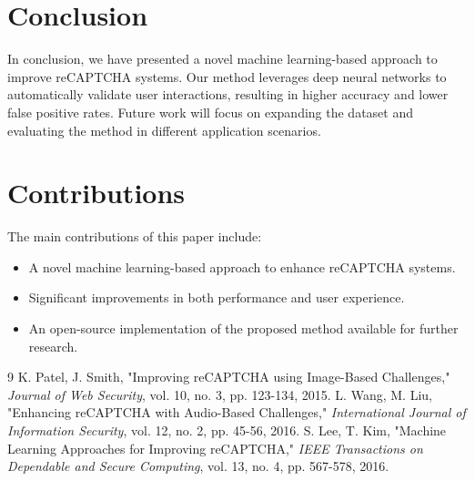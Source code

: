 \documentclass{article}
\begin{document}
\section{Conclusion}
In conclusion, we have presented a novel machine learning-based approach to improve reCAPTCHA systems. Our method leverages deep neural networks to automatically validate user interactions, resulting in higher accuracy and lower false positive rates. Future work will focus on expanding the dataset and evaluating the method in different application scenarios.

\section{Contributions}
The main contributions of this paper include:
\begin{itemize}
    \item A novel machine learning-based approach to enhance reCAPTCHA systems.
    \item Significant improvements in both performance and user experience.
    \item An open-source implementation of the proposed method available for further research.
\end{itemize}

\begin{thebibliography}{9}
 K. Patel, J. Smith, "Improving reCAPTCHA using Image-Based Challenges," \textit{Journal of Web Security}, vol. 10, no. 3, pp. 123-134, 2015.
 L. Wang, M. Liu, "Enhancing reCAPTCHA with Audio-Based Challenges," \textit{International Journal of Information Security}, vol. 12, no. 2, pp. 45-56, 2016.
 S. Lee, T. Kim, "Machine Learning Approaches for Improving reCAPTCHA," \textit{IEEE Transactions on Dependable and Secure Computing}, vol. 13, no. 4, pp. 567-578, 2016.
\end{thebibliography}
\end{document}

